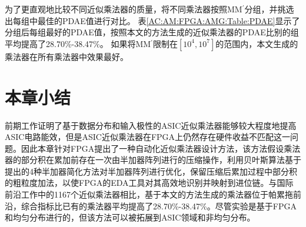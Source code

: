 为了更直观地比较不同近似乘法器的质量，将不同乘法器按照MM$^\prime$分组，并挑选出每组中最佳的PDAE值进行对比。
表\ref{AC:AM:FPGA:AMG:Table:PDAE}显示了分组后每组最好的PDAE值，按照本文的方法生成的近似乘法器的PDAE比别的组平均提高了28.70\%-38.47\%。
如果将MM$^\prime$限制在$[10^4,10^7]$的范围内，本文生成的乘法器在所有乘法器中效果最好。


\section{本章小结}

前期工作证明了基于数据分布和输入极性的ASIC近似乘法器能够较大程度地提高ASIC电路能效，但是ASIC近似乘法器在FPGA上仍然存在硬件收益不匹配这一问题。因此本章针对FPGA提出了一种自动化近似乘法器设计方法，该方法假设乘法器的部分积在累加前存在一次由半加器阵列进行的压缩操作，利用贝叶斯算法基于提出的4种半加器简化方法对半加器阵列进行优化，保留压缩后累加过程中部分积的粗粒度加法，以使FPGA的EDA工具对其高效地识别并映射到进位链。与国际前沿工作中的1167个近似乘法器相比，基于本文的方法生成的乘法器位于帕累拖前沿，综合指标比已有的乘法器平均提高了28.70\%-38.47\%。尽管实验是基于FPGA和均匀分布进行的，但该方法可以被拓展到ASIC领域和非均匀分布。

